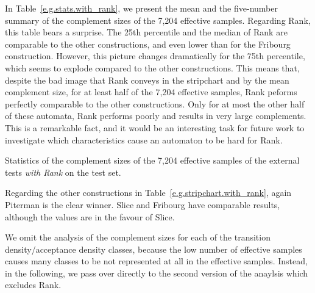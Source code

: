 In Table~\ref{e.g.stats.with_rank}, we present the mean and the five-number summary of the complement sizes of the 7,204 effective samples. Regarding Rank, this table bears a surprise. The 25th percentile and the median of Rank are comparable to the other constructions, and even lower than for the Fribourg construction. However, this picture changes dramatically for the 75th percentile, which seems to explode compared to the other constructions. This means that, despite the bad image that Rank conveys in the stripchart and by the mean complement size, for at least half of the 7,204 effective samples, Rank peforms perfectly comparable to the other constructions. Only for at most the other half of these automata, Rank performs poorly and results in very large complements. This is a remarkable fact, and it would be an interesting task for future work to investigate which characteristics cause an automaton to be hard for Rank.

\begin{table}[htb]
\centering

\caption{Statistics of the complement sizes of the 7,204 effective samples of the external tests \textit{with Rank} on the \goal{} test set.}
\label{e.g.stats.with_rank}
\end{table}

Regarding the other constructions in Table~\ref{e.g.stripchart.with_rank}, again Piterman is the clear winner. Slice and Fribourg have comparable results, although the values are in the favour of Slice.

We omit the analysis of the complement sizes for each of the transition density/acceptance density classes, because the low number of effective samples causes many classes to be not represented at all in the effective samples. Instead, in the following, we pass over directly to the second version of the anaylsis which excludes Rank.


